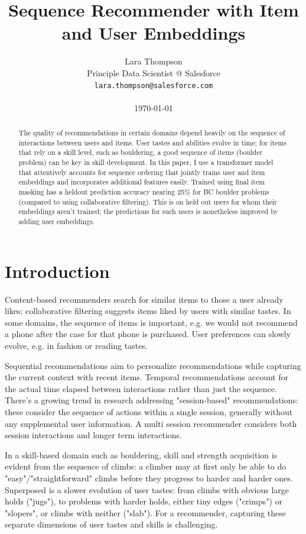 \documentclass[10pt]{article}
\title{Sequence Recommender with Item and User Embeddings}
\author{Lara Thompson \\
  Principle Data Scientist @ Salesforce \\
  \texttt{lara.thompson@salesforce.com} \\ \\
  \today
}
\begin{document}
\maketitle
\begin{abstract}
The quality of recommendations in certain domains depend heavily on the sequence of interactions between users and items. User tastes and abilities evolve in time; for items that rely on a skill level, such as bouldering, a good sequence of items (boulder problem) can be key in skill development. In this paper, I use a transformer model that attentively accounts for sequence ordering that jointly trains user and item embeddings and incorporates additional features easily. Trained using final item masking has a heldout prediction accuracy nearing 25\% for BC boulder problems (compared to  using collaborative filtering). This is on held out users for whom their embeddings aren't trained; the predictions for such users is nonetheless improved by adding user embeddings. 
\end{abstract}

\section{Introduction}

Content-based recommenders search for similar items to those a user already likes; collaborative filtering suggests items liked by users with similar tastes. In some domains, the sequence of items is important, e.g. we would not recommend a phone after the case for that phone is purchased. User preferences can slowly evolve, e.g. in fashion or reading tastes.

Sequential recommendations aim to personalize recommendations while capturing the current context with recent items. Temporal recommendations account for the actual time elapsed between interactions rather than just the sequence. There's a growing trend in research addressing "session-based" recommendations: these consider the sequence of actions within a single session, generally without any supplemental user information. A multi session recommender considers both session interactions and longer term interactions. 

In a skill-based domain such as bouldering, skill and strength acquisition is evident from the sequence of climbs: a climber may at first only be able to do "easy"/"straightforward" climbs before they progress to harder and harder ones. Superposed is a slower evolution of user tastes: from climbs with obvious large holds ("jugs"), to problems with harder holds, either tiny edges ("crimps") or "slopers", or climbs with neither ("slab"). For a recommender, capturing these separate dimensions of user tastes and skills is challenging. 
\end{document}
